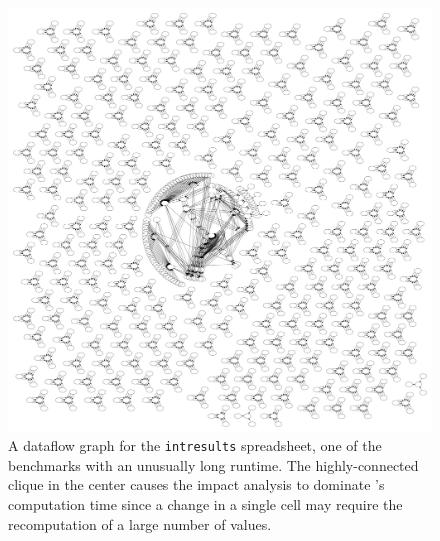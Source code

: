 \begin{figure}[!t]
\centering
\includegraphics[width=7in]{intresults_tree}
  \caption{A dataflow graph for the \texttt{intresults} spreadsheet, one of the benchmarks with an unusually long runtime.  The highly-connected clique in the center causes the impact analysis to dominate \checkcell{}'s computation time since a change in a single cell may require the recomputation of a large number of values. \label{fig:intresults_tree}}
\end{figure}
